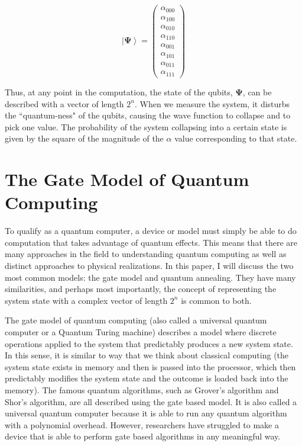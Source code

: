 \documentclass[11pt]{report}
\newcommand{\?}{\stackrel{?}{=}}
\begin{document}
$$\left | \mathbf{\Psi} \right \rangle=\begin{pmatrix}\alpha_{000}\\\alpha _{100}\\\alpha_{010}\\\alpha_{110}\\\alpha_{001}\\\alpha_{101}\\\alpha_{011}\\\alpha_{111}\end{pmatrix}$$

	Thus, at any point in the computation, the state of the qubits, $\mathbf{\Psi}$, can be described with a vector of length $2^{n}$. When we measure the system, it disturbs the ``quantum-ness" of the qubits, causing the wave function to collapse and to pick one value. The probability of the system collapsing into a certain state is given by the square of the magnitude of the $\alpha$ value corresponding to that state.

\section{The Gate Model of Quantum Computing}
To qualify as a quantum computer, a device or model must simply be able to do computation that takes advantage of quantum effects. This means that there are many approaches in the field to understanding quantum computing as well as distinct approaches to physical realizations. In this paper, I will discuss the two most common models: the gate model and quantum annealing. They have many similarities, and perhaps most importantly, the concept of representing the system state with a complex vector of length $2^n$ is common to both. 

The gate model of quantum computing (also called a universal quantum computer or a Quantum Turing machine) describes a model where discrete operations applied to the system that predictably produces a new system state. In this sense, it is similar to way that we think about classical computing (the system state exists in memory and then is passed into the processor, which then predictably modifies the system state and the outcome is loaded back into the memory). The famous quantum algorithms, such as Grover's algorithm and Shor's algorithm, are all described using the gate based model. It is also called a universal quantum computer because it is able to run any quantum algorithm with a polynomial overhead. However, researchers have struggled to make a device that is able to perform gate based algorithms in any meaningful way.
\end{document}
